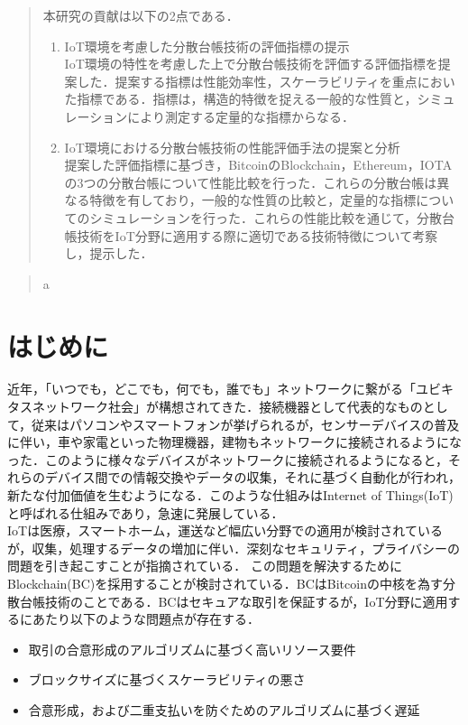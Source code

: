 \documentclass[japanese, macos]{KU2}
\begin{document}
\begin{abstract}
本研究の貢献は以下の2点である．
\begin{enumerate}
\item IoT環境を考慮した分散台帳技術の評価指標の提示\\
IoT環境の特性を考慮した上で分散台帳技術を評価する評価指標を提案した．提案する指標は性能効率性，スケーラビリティを重点においた指標である．指標は，構造的特徴を捉える一般的な性質と，シミュレーションにより測定する定量的な指標からなる．
\item IoT環境における分散台帳技術の性能評価手法の提案と分析\\
提案した評価指標に基づき，BitcoinのBlockchain，Ethereum，IOTAの3つの分散台帳について性能比較を行った．これらの分散台帳は異なる特徴を有しており，一般的な性質の比較と，定量的な指標についてのシミュレーションを行った．これらの性能比較を通じて，分散台帳技術をIoT分野に適用する際に適切である技術特徴について考察し，提示した．
\end{enumerate}
\end{abstract}

\begin{abstract}
a
\end{abstract}

\tableofcontents

\chapter{はじめに}
近年，「いつでも，どこでも，何でも，誰でも」ネットワークに繋がる「ユビキタスネットワーク社会」が構想されてきた．接続機器として代表的なものとして，従来はパソコンやスマートフォンが挙げられるが，センサーデバイスの普及に伴い，車や家電といった物理機器，建物もネットワークに接続されるようになった．このように様々なデバイスがネットワークに接続されるようになると，それらのデバイス間での情報交換やデータの収集，それに基づく自動化が行われ，新たな付加価値を生むようになる．このような仕組みはInternet of Things(IoT)と呼ばれる仕組みであり，急速に発展している\cite{Atzori2010}\cite{Gubbi2013}．\\
IoTは医療，スマートホーム，運送など幅広い分野での適用が検討されているが，収集，処理するデータの増加に伴い．深刻なセキュリティ，プライバシーの問題を引き起こすことが指摘されている\cite{dorri2017towards}．
この問題を解決するためにBlockchain(BC)を採用することが検討されている．BCはBitcoin\cite{nakamoto2008bitcoin}の中核を為す分散台帳技術のことである．BCはセキュアな取引を保証するが，IoT分野に適用するにあたり以下のような問題点が存在する．

\begin{itemize}
\item 取引の合意形成のアルゴリズムに基づく高いリソース要件
\item ブロックサイズに基づくスケーラビリティの悪さ
\item 合意形成，および二重支払いを防ぐためのアルゴリズムに基づく遅延
\end{itemize}
\end{document}
